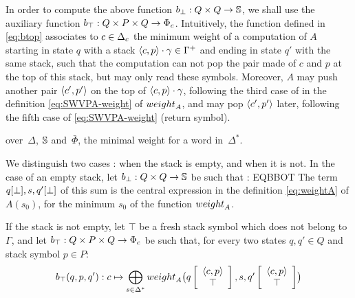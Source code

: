 \noindent
In order to compute the above function $b_\bot : Q \times Q \to \mathbb{S}$,
we shall use the auxiliary function $b_\top :  Q \times P \times Q \to \Phic$.
%
Intuitively, the function defined in \eqref{eq:btop}
associates to $c \in \Deltac$
the minimum weight of a computation of $A$
starting in state $q$ with a stack
$\<c, p> \cdot \gamma \in \Gamma^+$
and ending in state $q'$ with the same stack,
such that the computation can not pop
the pair made of $c$ and $p$ at the top of this stack,
but may only read these symbols.
Moreover, $A$ may push another pair $\< c', p'>$ %
on the top of $\<c, p> \cdot \gamma$,
following the third case of
in the definition \eqref{eq:SWVPA-weight} of $\weight_A$,
and may pop $\< c', p'>$ later, following the fifth case of \eqref{eq:SWVPA-weight} (return symbol).



over~$\Delta$, $\mathbb{S}$ and~$\bar\Phi$,
the minimal weight %
for a word in~$\Delta^*$.
%




\noindent
We distinguish two cases : when the stack is empty, and when it is not.
%
In the case of an empty stack, let $b_\bot : Q \times Q \to \mathbb{S}$ be such that : %
%
EQBBOT
%
The term $q[{\bot}], s, q'[{\bot}]$
of this sum is the central expression in
the definition \eqref{eq:weightA} of $A(s_0)$, for the minimum $s_0$
of the function $\weight_A$.

%
\noindent
If the stack is not empty, let $\top$ be a fresh stack symbol which does not belong to $\Gamma$,
and let $b_\top : Q \times P \times Q \to \Phic$ be such that,
for every two states $q, q' \in Q$
and stack symbol $p \in P$: %
\begin{equation}\label{eq:btop}
  b_\top(q, p, q') : c \mapsto \bigoplus_{s\in \Delta^*}
  \textstyle
  \weight_A\bigl(\configup{q}{\< c, p> \stackup \top }, s, \configup{q'}{\<c, p> \stackup \top}\bigr)
\end{equation}
%

